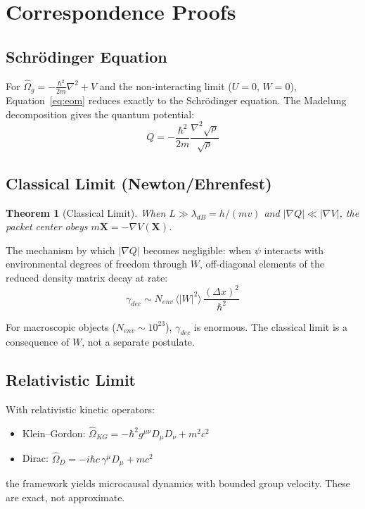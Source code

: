 \documentclass[11pt, a4paper]{article}
\newtheorem{theorem}{Theorem}[section]
\begin{document}
\section{Correspondence Proofs}

\subsection{Schr\"odinger Equation}

For $\hat{\Omega}_g = -\frac{\hbar^2}{2m}\nabla^2 + V$ and the
non-interacting limit ($U = 0$, $W = 0$), Equation~\ref{eq:eom}
reduces exactly to the Schr\"odinger equation. The Madelung
decomposition gives the quantum potential:
\begin{equation}
  Q = -\frac{\hbar^2}{2m}\frac{\nabla^2\sqrt{\rho}}{\sqrt{\rho}}
\end{equation}

\subsection{Classical Limit (Newton/Ehrenfest)}

\begin{theorem}[Classical Limit]
When $L \gg \lambda_{dB} = h/(mv)$ and $|\nabla Q| \ll |\nabla V|$,
the packet center obeys $m\ddot{\mathbf{X}} = -\nabla V(\mathbf{X})$.
\end{theorem}

The mechanism by which $|\nabla Q|$ becomes negligible: when $\psi$
interacts with environmental degrees of freedom through $W$,
off-diagonal elements of the reduced density matrix decay at rate:
\begin{equation}
  \gamma_{dec} \sim N_{env}\, \langle |W|^2 \rangle\,
  \frac{(\Delta x)^2}{\hbar^2}
\end{equation}

For macroscopic objects ($N_{env} \sim 10^{23}$), $\gamma_{dec}$ is
enormous. The classical limit is a consequence of $W$, not a separate
postulate.

\subsection{Relativistic Limit}

With relativistic kinetic operators:
\begin{itemize}[nosep]
  \item Klein--Gordon:
    $\hat{\Omega}_{KG} = -\hbar^2 g^{\mu\nu}D_\mu D_\nu + m^2 c^2$
  \item Dirac:
    $\hat{\Omega}_{D} = -i\hbar c\, \gamma^\mu D_\mu + mc^2$
\end{itemize}
the framework yields microcausal dynamics with bounded group velocity.
These are exact, not approximate.
\end{document}
